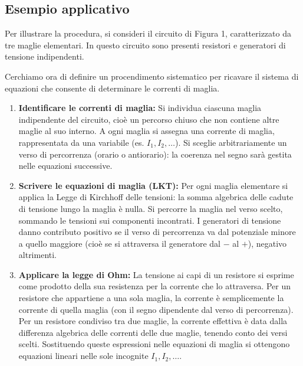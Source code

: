 \subsection*{\Large{Esempio applicativo}}
Per illustrare la procedura, si consideri il circuito di Figura 1, caratterizzato da tre maglie elementari. In questo circuito sono presenti resistori e generatori di tensione indipendenti.



Cerchiamo ora di definire un procendimento sistematico per ricavare il sistema di equazioni che consente di determinare le correnti di maglia.

\begin{enumerate}
    \item \textbf{Identificare le correnti di maglia:} 
    Si individua ciascuna maglia indipendente del circuito, cioè un percorso chiuso che non contiene altre maglie al suo interno. A ogni maglia si assegna una corrente di maglia, rappresentata da una variabile (es. $I_1, I_2, \dots$). Si sceglie arbitrariamente un verso di percorrenza (orario o antiorario): la coerenza nel segno sarà gestita nelle equazioni successive.

    \item \textbf{Scrivere le equazioni di maglia (LKT):} 
    Per ogni maglia elementare si applica la Legge di Kirchhoff delle tensioni: la somma algebrica delle cadute di tensione lungo la maglia è nulla. Si percorre la maglia nel verso scelto, sommando le tensioni sui componenti incontrati. I generatori di tensione danno contributo positivo se il verso di percorrenza va dal potenziale minore a quello maggiore (cioè se si attraversa il generatore dal $-$ al $+$), negativo altrimenti.

    \item \textbf{Applicare la legge di Ohm:} 
    La tensione ai capi di un resistore si esprime come prodotto della sua resistenza per la corrente che lo attraversa. Per un resistore che appartiene a una sola maglia, la corrente è semplicemente la corrente di quella maglia (con il segno dipendente dal verso di percorrenza). Per un resistore condiviso tra due maglie, la corrente effettiva è data dalla differenza algebrica delle correnti delle due maglie, tenendo conto dei versi scelti. Sostituendo queste espressioni nelle equazioni di maglia si ottengono equazioni lineari nelle sole incognite $I_1, I_2, \dots$.


\end{enumerate}
